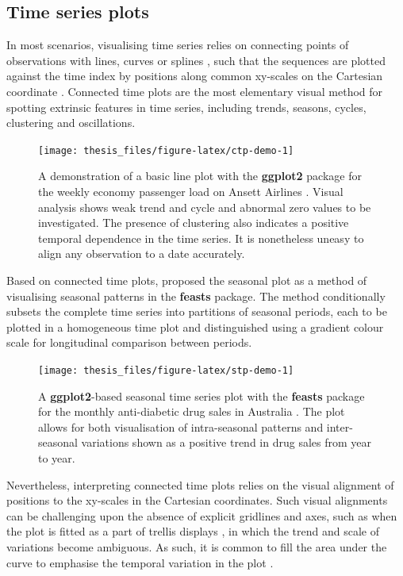 \documentclass{aucklandthesis}
\begin{document}
\hypertarget{time-series-plots}{%
\subsection{Time series plots}\label{time-series-plots}}

In most scenarios, visualising time series relies on connecting points of observations with lines, curves or splines \autocite{dataviz-ts}, such that the sequences are plotted against the time index by positions along common xy-scales on the Cartesian coordinate \autocite{fpp3}. Connected time plots are the most elementary visual method for spotting extrinsic features in time series, including trends, seasons, cycles, clustering and oscillations.

\begin{figure}
\texttt{[image: thesis\_files/figure-latex/ctp-demo-1]} \caption{A demonstration of a basic line plot with the \textbf{ggplot2} package \autocite{ggplot2} for the weekly economy passenger load on Ansett Airlines \autocite{fpp3d}. Visual analysis shows weak trend and cycle and abnormal zero values to be investigated. The presence of clustering also indicates a positive temporal dependence in the time series. It is nonetheless uneasy to align any observation to a date accurately.}\label{fig:ctp-demo}
\end{figure}



Based on connected time plots, \textcite{feasts} proposed the seasonal plot as a method of visualising seasonal patterns in the \textbf{feasts} package. The method conditionally subsets the complete time series into partitions of seasonal periods, each to be plotted in a homogeneous time plot and distinguished using a gradient colour scale for longitudinal comparison between periods.

\begin{figure}
\texttt{[image: thesis\_files/figure-latex/stp-demo-1]} \caption{A \textbf{ggplot2}-based seasonal time series plot with the \textbf{feasts} package \autocite{feasts} for the monthly anti-diabetic drug sales in Australia \autocite{fpp3d}. The plot allows for both visualisation of intra-seasonal patterns and inter-seasonal variations shown as a positive trend in drug sales from year to year.}\label{fig:stp-demo}
\end{figure}



Nevertheless, interpreting connected time plots relies on the visual alignment of positions to the xy-scales in the Cartesian coordinates. Such visual alignments can be challenging upon the absence of explicit gridlines and axes, such as when the plot is fitted as a part of trellis displays \autocite{trellis}, in which the trend and scale of variations become ambiguous. As such, it is common to fill the area under the curve to emphasise the temporal variation in the plot \autocite{dataviz-ts}.
\end{document}
